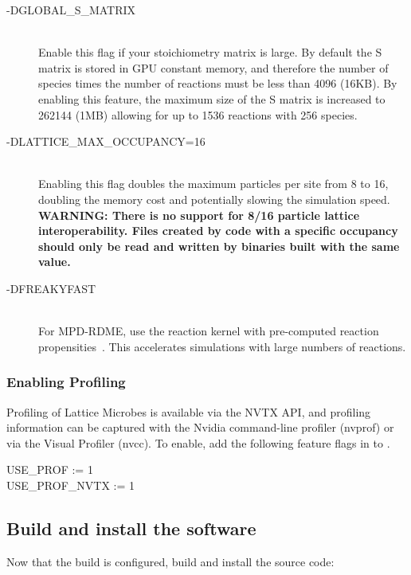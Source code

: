 \begin{description}
\item[-DGLOBAL\_S\_MATRIX] \hfill \\ Enable this flag if your stoichiometry matrix is large.  By default the S matrix is stored in GPU constant memory,  and therefore the number of species times the number of reactions must be less than 4096 (16KB).  By enabling this feature, the maximum size of the S matrix is increased to 262144 (1MB) allowing for up to 1536 reactions with 256 species.
\item[-DLATTICE\_MAX\_OCCUPANCY=16] \hfill \\ Enabling this flag doubles the maximum particles per site from 8 to 16, doubling the memory cost and potentially slowing the simulation speed.  \textbf{WARNING: There is no support for 8/16 particle lattice interoperability.  Files created by code with a specific occupancy should only be read and written by binaries built with the same value.}
\item[-DFREAKYFAST] \hfill \\ For MPD-RDME, use the reaction kernel with pre-computed reaction propensities~\cite{Hallock2016irk}.  This accelerates simulations with large numbers of reactions.
\end{description} 

\subsubsection{Enabling Profiling}

Profiling of Lattice Microbes is available via the NVTX API, and profiling
information can be captured with the Nvidia command-line profiler (nvprof)
or via the Visual Profiler (nvcc).  To enable, add the following feature
flags in to . 

USE\_PROF := 1 \\
USE\_PROF\_NVTX := 1

\subsection{Build and install the software}

Now that the build is configured, build and install the source code:\\

\\
\\

